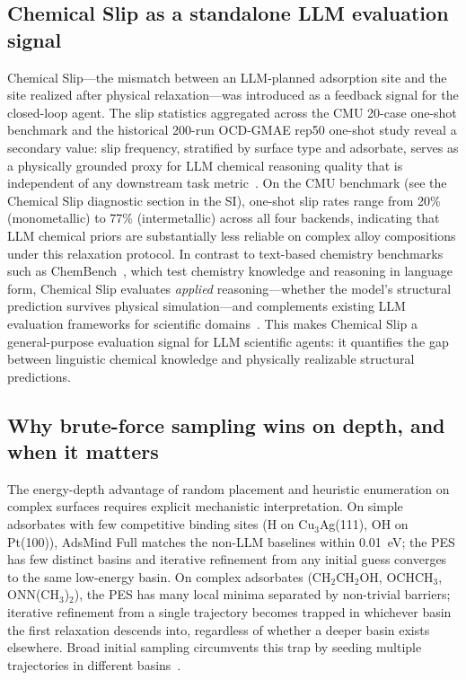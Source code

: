 \subsection{Chemical Slip as a standalone LLM evaluation signal}

Chemical Slip---the mismatch between an LLM-planned adsorption site and the site realized after physical relaxation---was introduced as a feedback signal for the closed-loop agent.
The slip statistics aggregated across the CMU 20-case one-shot benchmark and the historical 200-run OCD-GMAE rep50 one-shot study reveal a secondary value: slip frequency, stratified by surface type and adsorbate, serves as a physically grounded proxy for LLM chemical reasoning quality that is independent of any downstream task metric~\cite{alfred2026data,zhang2026towards}.
On the CMU benchmark (see the Chemical Slip diagnostic section in the SI), one-shot slip rates range from 20\% (monometallic) to 77\% (intermetallic) across all four backends, indicating that LLM chemical priors are substantially less reliable on complex alloy compositions under this relaxation protocol.
In contrast to text-based chemistry benchmarks such as ChemBench~\cite{mirza2024chembench}, which test chemistry knowledge and reasoning in language form, Chemical Slip evaluates \textit{applied} reasoning---whether the model's structural prediction survives physical simulation---and complements existing LLM evaluation frameworks for scientific domains~\cite{li2026agentic,huang2026towards}.
This makes Chemical Slip a general-purpose evaluation signal for LLM scientific agents: it quantifies the gap between linguistic chemical knowledge and physically realizable structural predictions.

\subsection{Why brute-force sampling wins on depth, and when it matters}

The energy-depth advantage of random placement and heuristic enumeration on complex surfaces requires explicit mechanistic interpretation.
On simple adsorbates with few competitive binding sites (H on Cu$_3$Ag(111), OH on Pt(100)), AdsMind Full matches the non-LLM baselines within 0.01~eV; the PES has few distinct basins and iterative refinement from any initial guess converges to the same low-energy basin.
On complex adsorbates (CH$_2$CH$_2$OH, OCHCH$_3$, ONN(CH$_3$)$_2$), the PES has many local minima separated by non-trivial barriers; iterative refinement from a single trajectory becomes trapped in whichever basin the first relaxation descends into, regardless of whether a deeper basin exists elsewhere.
Broad initial sampling circumvents this trap by seeding multiple trajectories in different basins~\cite{lan2023adsorbml,zitnick2020introduction}.

